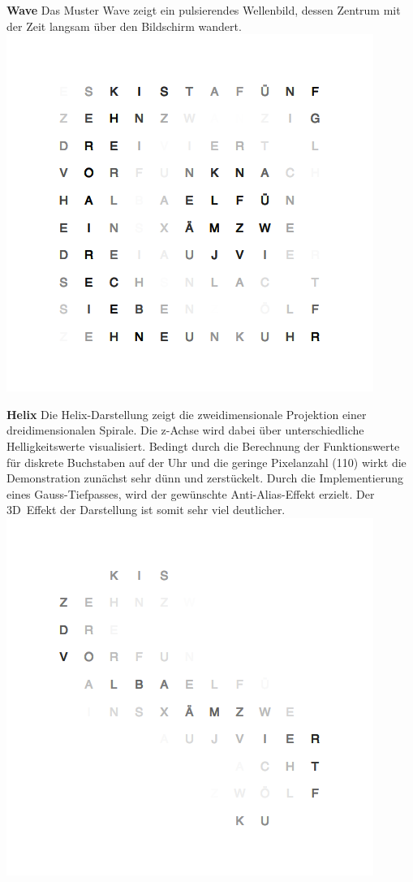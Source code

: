\begin{multicols}{2}
\textbf{Wave}
Das Muster Wave zeigt ein pulsierendes Wellenbild, dessen Zentrum mit der Zeit langsam über den Bildschirm wandert.
\includegraphics[width=\columnwidth]{Abbildungen/Software/Demo/Welle}

\textbf{Helix}
Die Helix-Darstellung zeigt die zweidimensionale Projektion einer dreidimensionalen Spirale. Die z-Achse wird dabei über unterschiedliche Helligkeitswerte visualisiert. Bedingt durch die Berechnung der Funktionswerte für diskrete Buchstaben auf der Uhr und die geringe Pixelanzahl (110) wirkt die Demonstration zunächst sehr dünn und zerstückelt. Durch die Implementierung eines Gauss-Tiefpasses, wird der gewünschte Anti-Alias-Effekt erzielt. Der 3D~Effekt der Darstellung ist somit sehr viel deutlicher.
\includegraphics[width=\columnwidth]{Abbildungen/Software/Demo/Helix}


\end{multicols}
